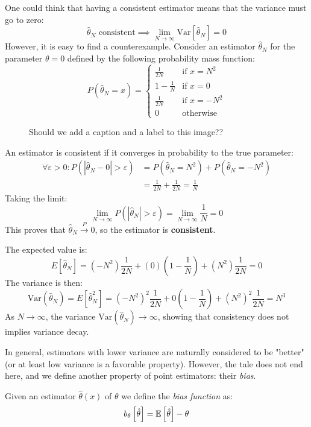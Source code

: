\begin{example}
	One could think that having a consistent estimator means that the variance must go to zero:
	\[
	\hat{\theta}_N \text{ consistent} \implies \lim_{N \to \infty} \text{Var}\left[\hat{\theta}_N\right] = 0
	\]
	However, it is easy to find a counterexample. Consider an estimator $\hat{\theta}_N$ for the parameter $\theta = 0$ defined by the following probability mass function:
	\[
	P(\hat{\theta}_N = x) = 
	\begin{cases} 
		\frac{1}{2N} & \text{if } x = N^2 \\
		1 - \frac{1}{N} & \text{if } x = 0 \\
		\frac{1}{2N} & \text{if } x = -N^2 \\
		0 & \text{otherwise}
	\end{cases}
	\]
	
	\begin{figure}[H]
		\centering
		
		\caption{Should we add a caption and a label to this image??}
	\end{figure}
	
	An estimator is consistent if it converges in probability to the true parameter: 
	\begin{align*}
		\forall \varepsilon > 0: P(|\hat{\theta}_N - 0| > \varepsilon) &= P(\hat{\theta}_N = N^2) + P(\hat{\theta}_N = -N^2) \\
		&= \frac{1}{2N} + \frac{1}{2N} = \frac{1}{N}
	\end{align*}
	Taking the limit:
	\[
	\lim_{N \to \infty} P(|\hat{\theta}_N| > \varepsilon) = \lim_{N \to \infty} \frac{1}{N} = 0
	\]
	This proves that $\hat{\theta}_N \xrightarrow{P} 0$, so the estimator is \textbf{consistent}.
	
	The expected value is:
	\[
	E[\hat{\theta}_N] = (-N^2)\frac{1}{2N} + (0)(1-\frac{1}{N}) + (N^2)\frac{1}{2N} = 0
	\]
	The variance is then:
	\[
	\text{Var}(\hat{\theta}_N) = E[\hat{\theta}_N^2] = (-N^2)^2 \frac{1}{2N} + 0 \left(1 - \frac{1}{N}\right) + (N^2)^2 \frac{1}{2N} = N^3
	\]
	As $N \to \infty$, the variance $\text{Var}(\hat{\theta}_N) \to \infty$, showing that consistency does not implies variance decay.
\end{example}


In general, estimators with lower variance are naturally considered to be "better" (or at least low variance is a favorable property). However, the tale does not end here, and we define another property of point estimators: their \emph{bias}.
\begin{definition}
	Given an estimator $\hat{\theta}(x)$ of $\theta$ we define the \emph{bias function} as:
	\[
	b_\theta\left[\hat\theta\right]=\mathbb{E}\left[\hat{\theta}\right]-\theta
	\]
\end{definition}

